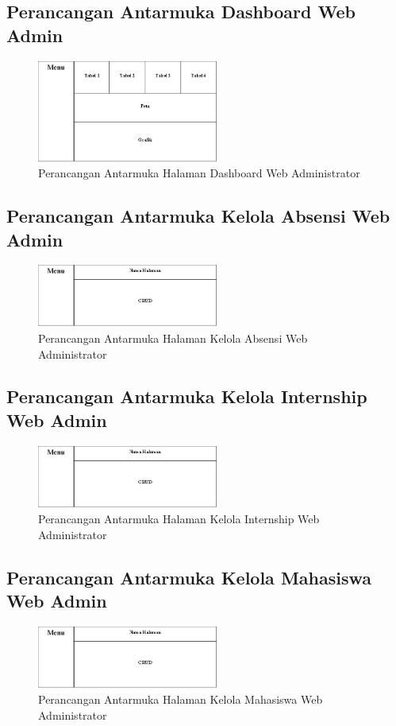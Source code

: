 \subsection{Perancangan Antarmuka Dashboard Web Admin}
	\begin{figure}[H]
		\includegraphics[width=6cm]{figures/diagram/image113.png}
		\centering
		\caption{Perancangan Antarmuka Halaman Dashboard Web Administrator}
	\end{figure}
\subsection{Perancangan Antarmuka Kelola Absensi Web Admin}
	\begin{figure}[H]
		\includegraphics[width=6cm]{figures/diagram/image114.png}
		\centering
		\caption{Perancangan Antarmuka Halaman Kelola Absensi Web Administrator}
	\end{figure}
\subsection{Perancangan Antarmuka Kelola Internship Web Admin}
	\begin{figure}[H]
		\includegraphics[width=6cm]{figures/diagram/image114.png}
		\centering
		\caption{Perancangan Antarmuka Halaman Kelola Internship Web Administrator}
	\end{figure}
\subsection{Perancangan Antarmuka Kelola Mahasiswa Web Admin}
	\begin{figure}[H]
		\includegraphics[width=6cm]{figures/diagram/image114.png}
		\centering
		\caption{Perancangan Antarmuka Halaman Kelola Mahasiswa Web Administrator}
	\end{figure}
